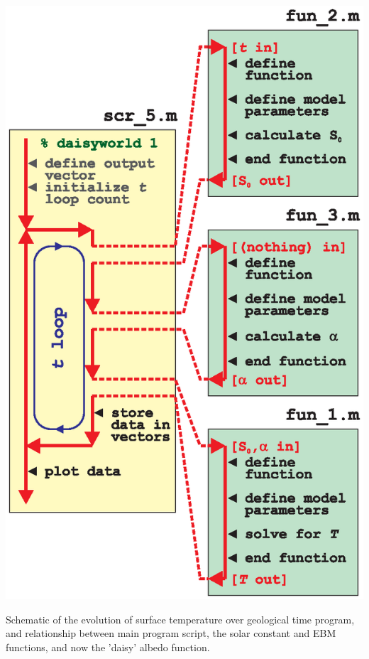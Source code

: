\documentclass{tufte-book} %
\begin{document}
\begin{marginfigure}[-2.in]
\includegraphics[width=\linewidth]{ch8-schematic-scr5fun1fun2fun3.eps}
\caption{Schematic of the evolution of surface temperature over geological time program, and relationship between main program script, the solar constant and EBM functions, and now the 'daisy' albedo function.}
\label{fig:ch8-schematic-scr5fun1fun2fun3}
\end{marginfigure}
\end{document}

